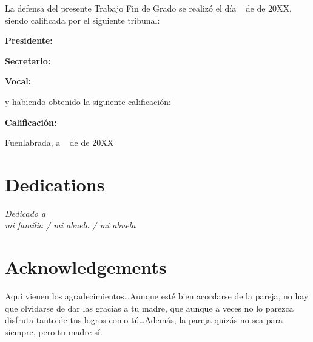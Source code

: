 \documentclass[a4paper, 12pt]{book}
\begin{document}
\vspace{1cm}
La defensa del presente Trabajo Fin de Grado se realizó el día \qquad$\;\,$ de \qquad\qquad\qquad\qquad \newline de 20XX, siendo calificada por el siguiente tribunal:


\vspace{0.5cm}
\textbf{Presidente:}

\vspace{1.2cm}
\textbf{Secretario:}

\vspace{1.2cm}
\textbf{Vocal:}


\vspace{1.2cm}
y habiendo obtenido la siguiente calificación:

\vspace{1cm}
\textbf{Calificación:}


\vspace{1cm}
\begin{flushright}
Fuenlabrada, a \qquad$\;\,$ de \qquad\qquad\qquad\qquad de 20XX
\end{flushright}


\chapter*{Dedications}
\begin{flushright}
\textit{Dedicado a \\
mi familia / mi abuelo / mi abuela}
\end{flushright}


\chapter*{Acknowledgements}

Aquí vienen los agradecimientos\ldots Aunque esté bien acordarse de la pareja,
no hay que olvidarse de dar las gracias a tu madre, que aunque a veces no lo
parezca disfruta tanto de tus logros como tú\ldots Además, la pareja quizás
no sea para siempre, pero tu madre sí.
\end{document}
